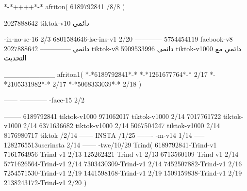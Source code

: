 *-*++++*-*
afriton(
6189792841 /8/8
)

2027888642 tiktok-v10
دائمي

-in-no-se-16 2/3
6801584646-lse-ins-v1 2/20
------------
5754454119 facbook-v8
دائمي
--------------
2027888642 tiktok-v8
دائمي
5909533996 tiktok-v1000
دائمي مع التحديث

__________
afriton1(
*-*6189792841*-*
*-*1261677764*-* 2/17
*-*2105331982*-* 2/17
*-*5068333039*-* 2/18
)

------
------------
-face-15 2/2

--------
6189792841 tiktok-v1000
971062017 tiktok-v1000 2/14
7017761722 tiktok-v1000 2/14
6371636682 tiktok-v1000 2/14
5067504247 tiktok-v1000 2/14
8176980717 tiktok /2/14
------
 INSTA /1/25
-------
-m-v14 1/14
-----
1282765513userinsta 2/14
------
-twe/10/29
Trind(
6189792841-Trind-v1 
7161764956-Trind-v1 2/13
125262421-Trind-v1 2/13
6713560109-Trind-v1 2/14
5771626564-Trind-v1 2/14
7303430309-Trind-v1 2/14
7452507882-Trind-v1 2/16
7254571530-Trind-v1 2/19
1441598168-Trind-v1 2/19
1509159838-Trind-v1 2/19
2138243172-Trind-v1 2/20
)
